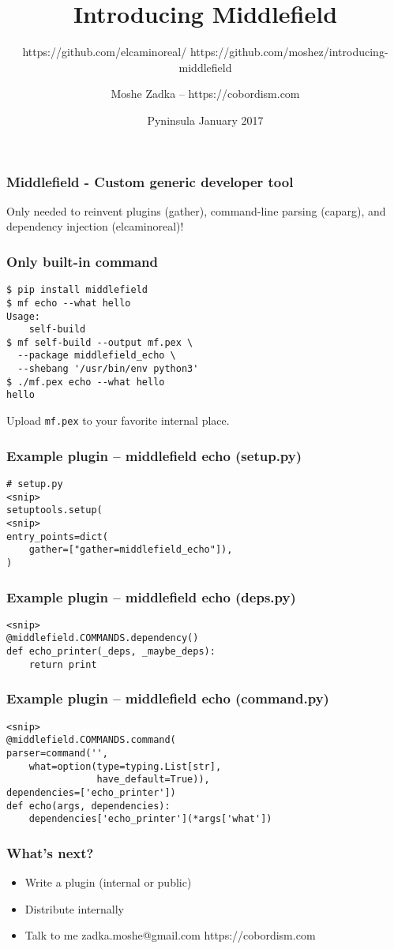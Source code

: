 \documentclass{beamer}
\title{Introducing Middlefield}
\subtitle{https://github.com/elcaminoreal/ https://github.com/moshez/introducing-middlefield}
\author{Moshe Zadka -- https://cobordism.com}
\date{Pyninsula January 2017}
\begin{document}
 
\frame{\titlepage}

\begin{frame}
\frametitle{Middlefield - Custom generic developer tool}
Only needed to reinvent plugins (gather),
command-line parsing (caparg),
and dependency injection (elcaminoreal)!
\end{frame}

\begin{frame}[fragile]
\frametitle{Only built-in command}
\begin{lstlisting}
$ pip install middlefield
$ mf echo --what hello
Usage:
    self-build
$ mf self-build --output mf.pex \
  --package middlefield_echo \
  --shebang '/usr/bin/env python3'
$ ./mf.pex echo --what hello 
hello
\end{lstlisting}
\pause
Upload \verb|mf.pex| to your favorite internal place.
\end{frame}

\begin{frame}[fragile]
\frametitle{Example plugin -- middlefield echo (setup.py)}
\begin{lstlisting}
# setup.py
<snip>
setuptools.setup(
<snip>
entry_points=dict(
    gather=["gather=middlefield_echo"]),
)
\end{lstlisting}
\end{frame}

\begin{frame}[fragile]
\frametitle{Example plugin -- middlefield echo (deps.py)}
\begin{lstlisting}
<snip>
@middlefield.COMMANDS.dependency()
def echo_printer(_deps, _maybe_deps):
    return print
\end{lstlisting}
\end{frame}

\begin{frame}[fragile]
\frametitle{Example plugin -- middlefield echo (command.py)}
\begin{lstlisting}
<snip>
@middlefield.COMMANDS.command(
parser=command('',
    what=option(type=typing.List[str],
                have_default=True)),
dependencies=['echo_printer'])
def echo(args, dependencies):
    dependencies['echo_printer'](*args['what'])
\end{lstlisting}
\end{frame}

\begin{frame}
\frametitle{What's next?}
\begin{itemize}
\item Write a plugin (internal or public)
\item Distribute internally
\item Talk to me zadka.moshe@gmail.com https://cobordism.com
\end{itemize}
\end{frame}
\end{document}
